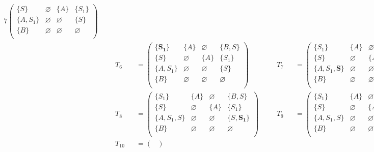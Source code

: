 \begin{example}
\begin{alignat*}{7}
\begin{pmatrix}
\{S\}       & \varnothing & \{A\}       & \{S_1\}     \\
\{A, S_1\}  & \varnothing & \varnothing & \{S\}       \\
\{B\}       & \varnothing & \varnothing & \varnothing \\
\end{pmatrix} \\ & &&T_6 &&= \begin{pmatrix}
\{\pmb{S_1}\}     & \{A\}       & \varnothing & \{B, S\}    \\
\{S\}       & \varnothing & \{A\}       & \{S_1\}     \\
\{A, S_1\}  & \varnothing & \varnothing & \{S\}       \\
\{B\}       & \varnothing & \varnothing & \varnothing \\
\end{pmatrix} \ \ \ \ &&T_7 &&= \begin{pmatrix}
\{S_1\}     & \{A\}       & \varnothing & \{B, S\}    \\
\{S\}       & \varnothing & \{A\}       & \{S_1\}     \\
\{A, S_1, \pmb{S}\}  & \varnothing & \varnothing & \{S\}    \\
\{B\}       & \varnothing & \varnothing & \varnothing \\
\end{pmatrix}  \\
& &&T_8 &&= \begin{pmatrix}
\{S_1\}     & \{A\}       & \varnothing & \{B, S\}    \\
\{S\}       & \varnothing & \{A\}       & \{S_1\}     \\
\{A, S_1, S\}  & \varnothing & \varnothing & \{S, \pmb{S_1}\} \\
\{B\}       & \varnothing & \varnothing & \varnothing \\
\end{pmatrix} \ \ \ \ &&T_9 &&= \begin{pmatrix}
\{S_1\}     & \{A\}       & \varnothing & \{B, S\}    \\
\{S\}       & \varnothing & \{A\}       & \{S_1, \pmb{S}\}     \\
\{A, S_1, S\}  & \varnothing & \varnothing & \{S, S_1\} \\
\{B\}       & \varnothing & \varnothing & \varnothing \\
\end{pmatrix} \\ & &&T_{10} &&= \begin{pmatrix}

\end{pmatrix}
\end{alignat*}
\end{example}
